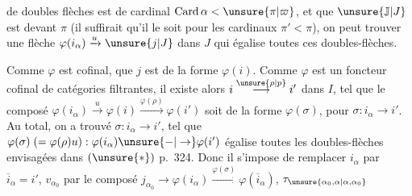 
 de  doubles flèches est de cardinal $\operatorname{Card}\alpha<\unsure{\pi|\varpi}$, et que $\unsure{\mathbb{J}|J}$ est  devant $\pi$ (il suffirait qu'il le soit pour les cardinaux $\pi'<\pi$), on peut trouver une flèche $\varphi(i_\alpha)\xrightarrow{u}\unsure{j|J}$ dans $J$ qui égalise toutes ces doubles-flèches.

Comme $\varphi$ est cofinal,  que $j$ est de la forme $\varphi(i)$. Comme $\varphi$ est un foncteur cofinal de catégories filtrantes, il existe alors $i\overset{\unsure{\rho|p}}{\longrightarrow}i'$ dans $I$, tel que \deleted{$\unsure{\varphi(\rho)}$} le composé $\varphi(i_\alpha)\xrightarrow{u}\varphi(i)\xrightarrow{\varphi(\rho)}\varphi(i')$ soit de la forme $\varphi(\sigma)$, pour $\sigma:i_\alpha\longrightarrow i'$.
Au total, on a trouvé $\sigma:i_\alpha\longrightarrow i'$, tel que $\varphi(\sigma)\;(=\varphi(\rho)u):\varphi(i_\alpha)\unsure{-|\to}\varphi(i')$ égalise toutes les doubles-flèches envisagées dans $(\unsure{*})$ p.~324. Donc il s'impose de remplacer $i_\alpha$ par $\overline{i}_\alpha=i'$, $v_{\alpha_0}$ par le composé $j_{\alpha_0}\to\varphi(i_\alpha)\xrightarrow{\varphi(\sigma)}\varphi(\overline{i}_\alpha)$, $\tau_{\unsure{\alpha_0,\alpha|\alpha,\alpha_0}}$
